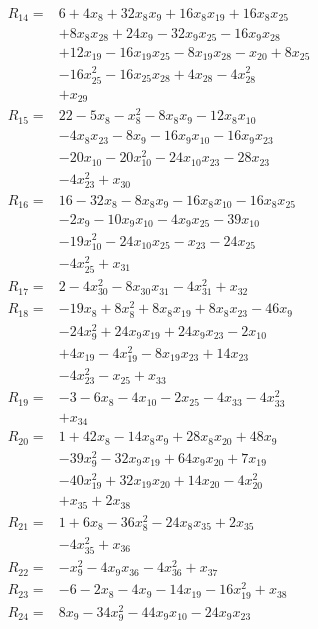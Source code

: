 \begin{align*}
R_{14}={}&6 +4x_{8} +32x_{8}x_{9} +16x_{8}x_{19} +16x_{8}x_{25}\\
&+8x_{8}x_{28} +24x_{9} -32x_{9}x_{25} -16x_{9}x_{28}\\
&+12x_{19} -16x_{19}x_{25} -8x_{19}x_{28} -x_{20} +8x_{25}\\
&-16x_{25}^{2} -16x_{25}x_{28} +4x_{28} -4x_{28}^{2}\\
&+x_{29}\\[3pt]
R_{15}={}&22 -5x_{8} -x_{8}^{2} -8x_{8}x_{9} -12x_{8}x_{10}\\
&-4x_{8}x_{23} -8x_{9} -16x_{9}x_{10} -16x_{9}x_{23}\\
&-20x_{10} -20x_{10}^{2} -24x_{10}x_{23} -28x_{23}\\
&-4x_{23}^{2} +x_{30}\\[3pt]
R_{16}={}&16 -32x_{8} -8x_{8}x_{9} -16x_{8}x_{10} -16x_{8}x_{25}\\
&-2x_{9} -10x_{9}x_{10} -4x_{9}x_{25} -39x_{10}\\
&-19x_{10}^{2} -24x_{10}x_{25} -x_{23} -24x_{25}\\
&-4x_{25}^{2} +x_{31}\\[3pt]
R_{17}={}&2 -4x_{30}^{2} -8x_{30}x_{31} -4x_{31}^{2} +x_{32}\\[3pt]
R_{18}={}&-19x_{8} +8x_{8}^{2} +8x_{8}x_{19} +8x_{8}x_{23} -46x_{9}\\
&-24x_{9}^{2} +24x_{9}x_{19} +24x_{9}x_{23} -2x_{10}\\
&+4x_{19} -4x_{19}^{2} -8x_{19}x_{23} +14x_{23}\\
&-4x_{23}^{2} -x_{25} +x_{33}\\[3pt]
R_{19}={}&-3 -6x_{8} -4x_{10} -2x_{25} -4x_{33} -4x_{33}^{2}\\
&+x_{34}\\[3pt]
R_{20}={}&1 +42x_{8} -14x_{8}x_{9} +28x_{8}x_{20} +48x_{9}\\
&-39x_{9}^{2} -32x_{9}x_{19} +64x_{9}x_{20} +7x_{19}\\
&-40x_{19}^{2} +32x_{19}x_{20} +14x_{20} -4x_{20}^{2}\\
&+x_{35} +2x_{38}\\[3pt]
R_{21}={}&1 +6x_{8} -36x_{8}^{2} -24x_{8}x_{35} +2x_{35}\\
&-4x_{35}^{2} +x_{36}\\[3pt]
R_{22}={}&-x_{9}^{2} -4x_{9}x_{36} -4x_{36}^{2} +x_{37}\\[3pt]
R_{23}={}&-6 -2x_{8} -4x_{9} -14x_{19} -16x_{19}^{2} +x_{38}\\[3pt]
R_{24}={}&8x_{9} -34x_{9}^{2} -44x_{9}x_{10} -24x_{9}x_{23}\\

\end{align*}
